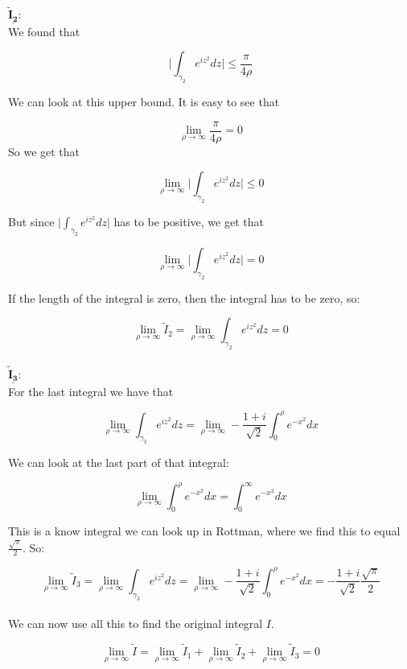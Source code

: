 \documentclass[a4paper,norsk, 10pt]{article}
\begin{document}
$\underline{\mathbf{\tilde{I}_2}}$:\\

We found that

$$
\bigg|\int_{\gamma_2}e^{iz^2}dz \bigg| \leq \frac{\pi}{4\rho}
$$

We can look at this upper bound. It is easy to see that

$$
\lim_{\rho\rightarrow \infty} \frac{\pi}{4\rho} = 0
$$
So we get that

$$
\lim_{\rho \rightarrow \infty } \bigg|\int_{\gamma_2}e^{iz^2}dz \bigg| \leq 0
$$

But since $\big|\int_{\gamma_2}e^{iz^2}dz \big|$ has to be positive, we get that

$$
\lim_{\rho \rightarrow \infty } \bigg|\int_{\gamma_2}e^{iz^2}dz \bigg| = 0
$$

If the length of the integral is zero, then the integral has to be zero, so:

\begin{equation}
\lim_{\rho \rightarrow \infty} \tilde{I}_2 = \lim_{\rho \rightarrow \infty}  \int_{\gamma_2}e^{iz^2}dz = 0
\label{I2rhoInf}
\end{equation}\\

$\underline{\mathbf{\tilde{I}_3}}$:\\

For the last integral we have that 

$$
\lim_{\rho \rightarrow \infty}  \int_{\gamma_3}e^{iz^2}dz = \lim_{\rho \rightarrow \infty} -\frac{1+i}{\sqrt{2}}  \int_0^{\rho}e^{-x^2}dx 
$$

We can look at the last part of that integral:

$$
\lim_{\rho \rightarrow \infty} \int_0^{\rho}e^{-x^2}dx  = \int_0^{\infty}e^{-x^2}dx
$$

This is a know integral we can look up in Rottman, where we find this to equal $\frac{\sqrt{\pi}}{2}$. So:

\begin{equation}
\lim_{\rho \rightarrow \infty} \tilde{I}_3 = \lim_{\rho \rightarrow \infty} \int_{\gamma_3}e^{iz^2}dz = \lim_{\rho \rightarrow \infty} -\frac{1+i}{\sqrt{2}}  \int_0^{\rho}e^{-x^2}dx = -\frac{1+i}{\sqrt{2}} \frac{\sqrt{\pi}}{2}
\label{I3rhoinf}
\end{equation}\\

We can now use all this to find the original integral $I$.

$$
\lim_{\rho \rightarrow \infty} \tilde{I} = \lim_{\rho \rightarrow \infty} \tilde{I}_1 + \lim_{\rho \rightarrow \infty} \tilde{I}_2 + \lim_{\rho \rightarrow \infty} \tilde{I}_3 = 0
$$
\end{document}
